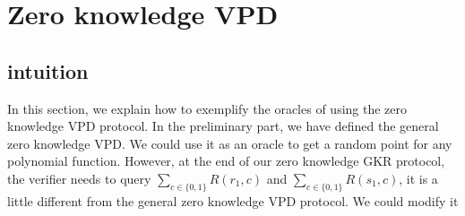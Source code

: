 \section{Zero knowledge VPD}
\subsection{intuition}
In this section, we explain how to exemplify the oracles of using the zero knowledge VPD protocol. In the preliminary part, we have defined the general zero knowledge VPD. We could use it as an oracle to get a random point for any polynomial function. However, at the end of our zero knowledge GKR protocol, the verifier needs to query $\sum\limits_{c \in \{0, 1\}}R(r_1, c)$ and $\sum\limits_{c \in \{0, 1\}}R(s_1, c)$, it is a little different from the general zero knowledge VPD protocol. We could modify it 













